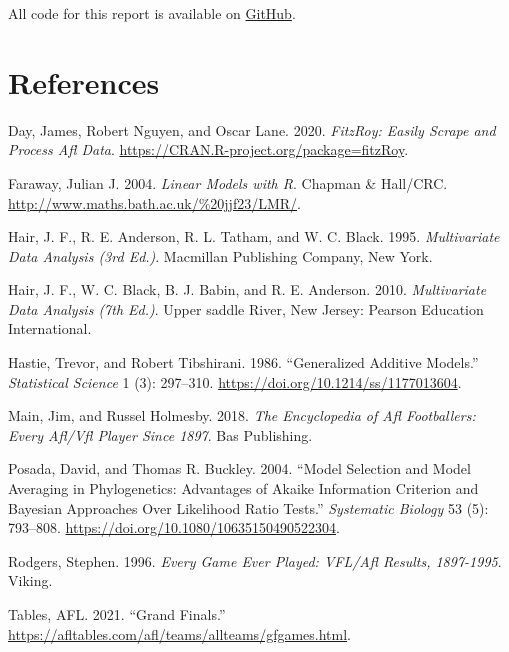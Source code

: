 \documentclass{article}
\begin{document}
All code for this report is available on \href{https://github.com/hendersontrent/phd-coursework/tree/main/olet5608}{GitHub}.

\pagebreak

\hypertarget{references}{%
\section*{References}\label{references}}

\hypertarget{refs}{}
\leavevmode\hypertarget{ref-fitzRoy}{}%
Day, James, Robert Nguyen, and Oscar Lane. 2020. \emph{FitzRoy: Easily Scrape and Process Afl Data}. \url{https://CRAN.R-project.org/package=fitzRoy}.

\leavevmode\hypertarget{ref-R:Faraway:2004}{}%
Faraway, Julian J. 2004. \emph{Linear Models with R}. Chapman \& Hall/CRC. \url{http://www.maths.bath.ac.uk/\%20jjf23/LMR/}.

\leavevmode\hypertarget{ref-multi2}{}%
Hair, J. F., R. E. Anderson, R. L. Tatham, and W. C. Black. 1995. \emph{Multivariate Data Analysis (3rd Ed.)}. Macmillan Publishing Company, New York.

\leavevmode\hypertarget{ref-multi1}{}%
Hair, J. F., W. C. Black, B. J. Babin, and R. E. Anderson. 2010. \emph{Multivariate Data Analysis (7th Ed.)}. Upper saddle River, New Jersey: Pearson Education International.

\leavevmode\hypertarget{ref-10.1214ux2fssux2f1177013604}{}%
Hastie, Trevor, and Robert Tibshirani. 1986. ``Generalized Additive Models.'' \emph{Statistical Science} 1 (3): 297--310. \url{https://doi.org/10.1214/ss/1177013604}.

\leavevmode\hypertarget{ref-everyone}{}%
Main, Jim, and Russel Holmesby. 2018. \emph{The Encyclopedia of Afl Footballers: Every Afl/Vfl Player Since 1897}. Bas Publishing.

\leavevmode\hypertarget{ref-10.1080ux2f10635150490522304}{}%
Posada, David, and Thomas R. Buckley. 2004. ``Model Selection and Model Averaging in Phylogenetics: Advantages of Akaike Information Criterion and Bayesian Approaches Over Likelihood Ratio Tests.'' \emph{Systematic Biology} 53 (5): 793--808. \url{https://doi.org/10.1080/10635150490522304}.

\leavevmode\hypertarget{ref-everygame}{}%
Rodgers, Stephen. 1996. \emph{Every Game Ever Played: VFL/Afl Results, 1897-1995}. Viking.

\leavevmode\hypertarget{ref-attendance}{}%
Tables, AFL. 2021. ``Grand Finals.'' \url{https://afltables.com/afl/teams/allteams/gfgames.html}.
\end{document}
